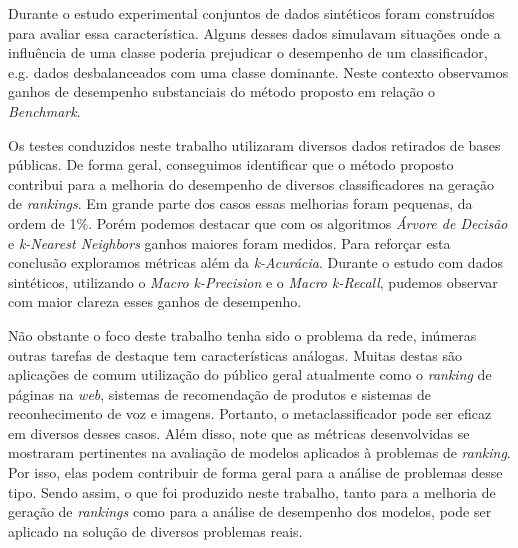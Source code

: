 Durante o estudo experimental conjuntos de dados sintéticos foram construídos para avaliar essa característica.
Alguns desses dados simulavam situações onde a influência de uma classe poderia prejudicar o desempenho de um classificador, e.g. dados desbalanceados com uma classe dominante.
Neste contexto observamos ganhos de desempenho substanciais do método proposto em relação o \textit{Benchmark}.

Os testes conduzidos neste trabalho utilizaram diversos dados retirados de bases públicas.
De forma geral, conseguimos identificar que o método proposto contribui para a melhoria do desempenho de diversos classificadores na geração de \textit{rankings}.
Em grande parte dos casos essas melhorias foram pequenas, da ordem de 1\%.
Porém podemos destacar que com os algoritmos \textit{Árvore de Decisão} e \textit{k-Nearest Neighbors} ganhos maiores foram medidos.
Para reforçar esta conclusão exploramos métricas além da \textit{k-Acurácia}.
Durante o estudo com dados sintéticos, utilizando o \textit{Macro k-Precision} e o \textit{Macro k-Recall}, pudemos observar com maior clareza esses ganhos de desempenho.

Não obstante o foco deste trabalho tenha sido o problema da rede, inúmeras outras tarefas de destaque tem características análogas.
Muitas destas são aplicações de comum utilização do público geral atualmente como o \textit{ranking} de páginas na \textit{web}, sistemas de recomendação de produtos e sistemas de reconhecimento de voz e imagens.
Portanto, o metaclassificador pode ser eficaz em diversos desses casos.
Além disso, note que as métricas desenvolvidas se mostraram pertinentes na avaliação de modelos aplicados à problemas de \textit{ranking}.
Por isso, elas podem contribuir de forma geral para a análise de problemas desse tipo.
Sendo assim, o que foi produzido neste trabalho, tanto para a melhoria de geração de \textit{rankings} como para a análise de desempenho dos modelos, pode ser aplicado na solução de diversos problemas reais.
